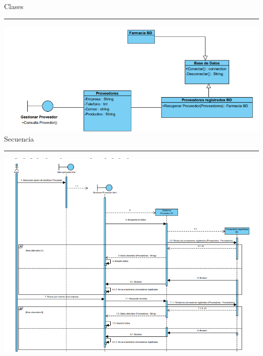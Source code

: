 {
\begin{flushleft}
	
	\Large{Clases}\\
	\rule{14cm}{0.5pt}

	\includegraphics[width=14cm]{casouso/cu8/images/Diagrama de clases.jpg}\\	

	\Large{Secuencia}\\
	\rule{14cm}{0.5pt}

	\includegraphics[width=14cm]{casouso/cu8/images/Diagrama secuencia.jpg}\\	
	
\end{flushleft}
}